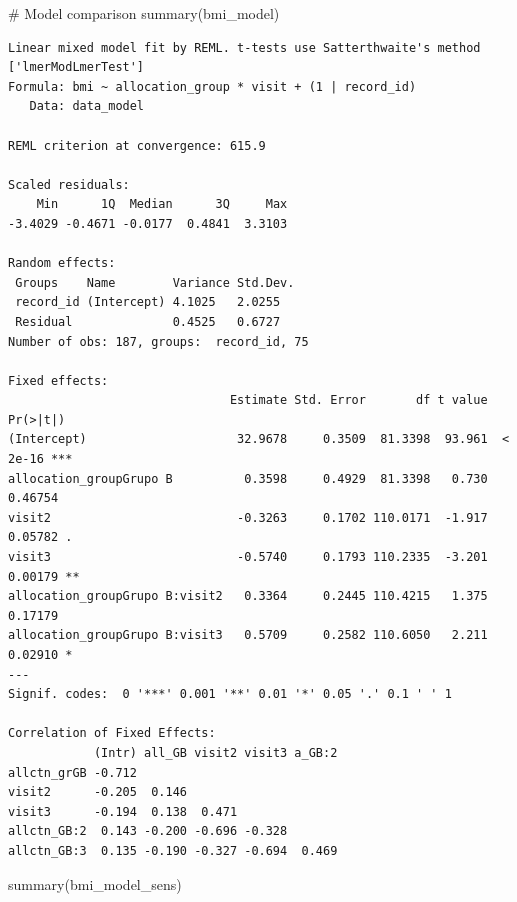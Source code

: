 \documentclass[
  12pt,
]{article}
\newenvironment{Shaded}{\begin{snugshade}}{\end{snugshade}}
\newcommand{\CommentTok}[1]{\textcolor[rgb]{0.37,0.37,0.37}{#1}}
\newcommand{\FunctionTok}[1]{\textcolor[rgb]{0.28,0.35,0.67}{#1}}
\newcommand{\NormalTok}[1]{\textcolor[rgb]{0.00,0.23,0.31}{#1}}
\begin{document}
\begin{Shaded}
\begin{Highlighting}[]
\CommentTok{\# Model comparison}
\FunctionTok{summary}\NormalTok{(bmi\_model)}
\end{Highlighting}
\end{Shaded}

\begin{verbatim}
Linear mixed model fit by REML. t-tests use Satterthwaite's method ['lmerModLmerTest']
Formula: bmi ~ allocation_group * visit + (1 | record_id)
   Data: data_model

REML criterion at convergence: 615.9

Scaled residuals: 
    Min      1Q  Median      3Q     Max 
-3.4029 -0.4671 -0.0177  0.4841  3.3103 

Random effects:
 Groups    Name        Variance Std.Dev.
 record_id (Intercept) 4.1025   2.0255  
 Residual              0.4525   0.6727  
Number of obs: 187, groups:  record_id, 75

Fixed effects:
                               Estimate Std. Error       df t value Pr(>|t|)    
(Intercept)                     32.9678     0.3509  81.3398  93.961  < 2e-16 ***
allocation_groupGrupo B          0.3598     0.4929  81.3398   0.730  0.46754    
visit2                          -0.3263     0.1702 110.0171  -1.917  0.05782 .  
visit3                          -0.5740     0.1793 110.2335  -3.201  0.00179 ** 
allocation_groupGrupo B:visit2   0.3364     0.2445 110.4215   1.375  0.17179    
allocation_groupGrupo B:visit3   0.5709     0.2582 110.6050   2.211  0.02910 *  
---
Signif. codes:  0 '***' 0.001 '**' 0.01 '*' 0.05 '.' 0.1 ' ' 1

Correlation of Fixed Effects:
            (Intr) all_GB visit2 visit3 a_GB:2
allctn_grGB -0.712                            
visit2      -0.205  0.146                     
visit3      -0.194  0.138  0.471              
allctn_GB:2  0.143 -0.200 -0.696 -0.328       
allctn_GB:3  0.135 -0.190 -0.327 -0.694  0.469
\end{verbatim}

\begin{Shaded}
\begin{Highlighting}[]
\FunctionTok{summary}\NormalTok{(bmi\_model\_sens)}
\end{Highlighting}
\end{Shaded}
\end{document}
